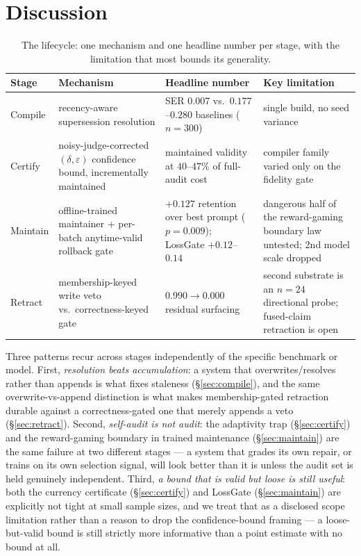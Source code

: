 \section{Discussion}
\label{sec:discussion}

\begin{table}[h]
\centering
\small
\caption{The lifecycle: one mechanism and one headline number per stage, with the limitation that most bounds its generality.}
\label{tab:lifecycle}
\begin{tabular}{p{1.7cm}p{3.6cm}p{3.9cm}p{4.3cm}}
\toprule
Stage & Mechanism & Headline number & Key limitation \\
\midrule
Compile & recency-aware supersession resolution & SER $0.007$ vs.\ $0.177$--$0.280$ baselines ($n{=}300$) & single build, no seed variance \\
Certify & noisy-judge-corrected $(\delta,\varepsilon)$ confidence bound, incrementally maintained & maintained validity at $40$--$47\%$ of full-audit cost & compiler family varied only on the fidelity gate \\
Maintain & offline-trained maintainer + per-batch anytime-valid rollback gate & $+0.127$ retention over best prompt ($p{=}0.009$); LossGate $+0.12$--$0.14$ & dangerous half of the reward-gaming boundary law untested; 2nd model scale dropped \\
Retract & membership-keyed write veto vs.\ correctness-keyed gate & $0.990 \to 0.000$ residual surfacing & second substrate is an $n{=}24$ directional probe; fused-claim retraction is open \\
\bottomrule
\end{tabular}
\end{table}

Three patterns recur across stages independently of the specific benchmark or model. First, \emph{resolution beats accumulation}: a system that overwrites/resolves rather than appends is what fixes staleness (\S\ref{sec:compile}), and the same overwrite-vs-append distinction is what makes membership-gated retraction durable against a correctness-gated one that merely appends a veto (\S\ref{sec:retract}). Second, \emph{self-audit is not audit}: the adaptivity trap (\S\ref{sec:certify}) and the reward-gaming boundary in trained maintenance (\S\ref{sec:maintain}) are the same failure at two different stages --- a system that grades its own repair, or trains on its own selection signal, will look better than it is unless the audit set is held genuinely independent. Third, \emph{a bound that is valid but loose is still useful}: both the currency certificate (\S\ref{sec:certify}) and LossGate (\S\ref{sec:maintain}) are explicitly not tight at small sample sizes, and we treat that as a disclosed scope limitation rather than a reason to drop the confidence-bound framing --- a loose-but-valid bound is still strictly more informative than a point estimate with no bound at all.

